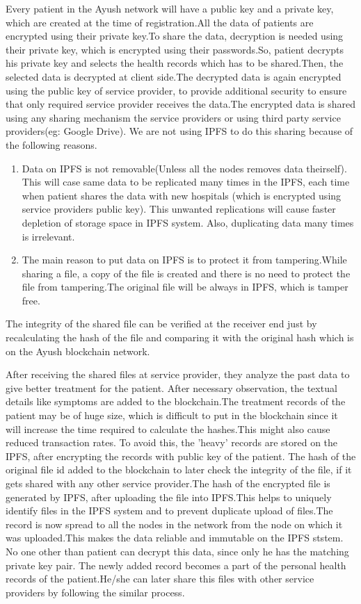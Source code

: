 \documentclass[11pt]{report}
\begin{document}
    \par Every patient in the Ayush network will have a public key and a private key, which are created at the time of registration.All the data of patients are encrypted using their private key.To share the data, decryption is needed using their private key, which is encrypted using their passwords.So, patient decrypts his private key and selects the health records which has to be shared.Then, the selected data is decrypted at client side.The decrypted data is again encrypted using the public key of service provider, to provide additional security to ensure that only required service provider receives the data.The encrypted data is shared using any sharing mechanism the service providers or using third party service providers(eg: Google Drive). We are not using IPFS to do this sharing because of the following reasons.
    \begin{enumerate}
        \item Data on IPFS is not removable(Unless all the nodes removes data theirself). This will case same data to be replicated many times in the IPFS, each time when patient shares the data with new hospitals (which is encrypted using service providers public key). This unwanted replications will cause faster depletion of storage space in IPFS system. Also, duplicating data many times is irrelevant.
        \item The main reason to put data on IPFS is to protect it from tampering.While sharing a file, a copy of the file is created and there is no need to protect the file from tampering.The original file will be always in IPFS, which is tamper free. 
    \end{enumerate}
    The integrity of the shared file can be verified at the receiver end just by recalculating the hash of the file and comparing it with the original hash which is on the Ayush blockchain network.
    \par After receiving the shared files at service provider, they analyze the past data to give better treatment for the patient. After necessary observation, the textual details like symptoms are added to the blockchain.The treatment records of the patient may be of huge size, which is difficult to put in the blockchain since it will increase the time required to calculate the hashes.This might also cause reduced transaction rates. To avoid this, the 'heavy' records are stored on the IPFS, after encrypting the records with public key of the patient. The hash of the original file id added to the blockchain to later check the integrity of the file, if it gets shared with any other service provider.The hash of the encrypted file is generated by IPFS, after uploading the file into IPFS.This helps to uniquely identify files in the IPFS system and to prevent duplicate upload of files.The record is now spread to all the nodes in the network from the node on which it was uploaded.This makes the data reliable and immutable on the IPFS ststem. No one other than patient can decrypt this data, since only he has the matching private key pair. The newly added record becomes a part of the personal health records of the patient.He/she can later share this files with other service providers by following the similar process.
        
\end{document}
